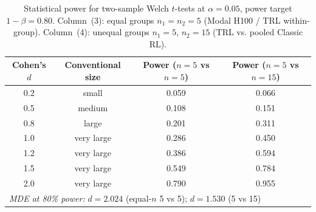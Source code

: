\begin{table}[!ht]
\centering
\caption{Statistical power for two-sample Welch $t$-tests at $\alpha = 0.05$,
         power target $1{-}\beta = 0.80$.
         Column~(3): equal groups $n_1 = n_2 = 5$ (Modal H100 / TRL within-group).
         Column~(4): unequal groups $n_1 = 5$, $n_2 = 15$ (TRL vs. pooled Classic RL).}
\label{tab:power-analysis}
\small
\begin{tabular}{@{}cccc@{}}
\toprule
Cohen's $d$ & Conventional size & Power ($n{=}5$ vs $n{=}5$) & Power ($n{=}5$ vs $n{=}15$) \\
\midrule
        0.2 & small & 0.059 & 0.066 \\
        0.5 & medium & 0.108 & 0.151 \\
        0.8 & large & 0.201 & 0.311 \\
        1.0 & very large & 0.286 & 0.450 \\
        1.2 & very large & 0.386 & 0.594 \\
        1.5 & very large & 0.549 & 0.784 \\
        2.0 & very large & 0.790 & 0.955 \\
\midrule
\multicolumn{4}{l}{\textit{MDE at 80\% power:} $d = 2.024$ (equal-$n$ 5 vs 5);\; $d = 1.530$ (5 vs 15)} \\
\bottomrule
\end{tabular}
\end{table}

